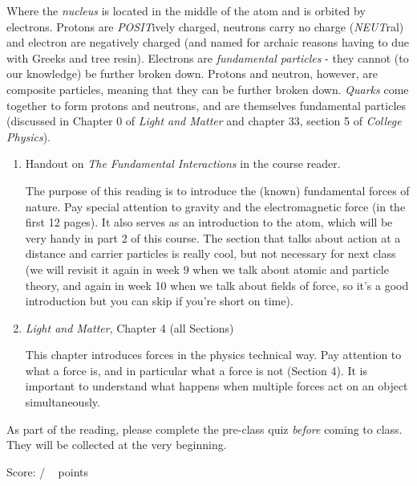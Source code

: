 \documentclass[addpoints,12pt]{exam}
\begin{document}
Where the \textit{nucleus} is located in the middle of the atom and is orbited by electrons. Protons are \textit{POSIT}ively charged, neutrons carry no charge (\textit{NEUT}ral) and electron are negatively charged (and named for archaic reasons having to due with Greeks and tree resin). Electrons are \textit{fundamental particles} - they cannot (to our knowledge) be further broken down. Protons and neutron, however, are composite particles, meaning that they can be further broken down. \textit{Quarks} come together to form protons and neutrons, and are themselves fundamental particles (discussed in Chapter 0 of \textit{Light and Matter} and chapter 33, section 5 of \textit{College Physics}).

\begin{enumerate}

	\item Handout on \textit{The Fundamental Interactions} in the course reader.
	
	The purpose of this reading is to introduce the (known) fundamental forces of nature. Pay special attention to gravity and the electromagnetic force (in the first 12 pages). It also serves as an introduction to the atom, which will be very handy in part 2 of this course. The section that talks about action at a distance and carrier particles is really cool, but not necessary for next class (we will revisit it again in week 9 when we talk about atomic and particle theory, and again in week 10 when we talk about fields of force, so it's a good introduction but you can skip if you're short on time).
	
	\item \textit{Light and Matter}, Chapter 4 (all Sections)
	
	This chapter introduces forces in the physics technical way. Pay attention to what a force is, and in particular what a force is not (Section 4). It is important to understand what happens when multiple forces act on an object simultaneously.
	
	
\end{enumerate}

As part of the reading, please complete the pre-class quiz \textit{before} coming to class. They will be collected at the very beginning.
 
\clearpage

\begin{flushright}
Score: \hspace{0.2in} / \numpoints ~ points
\end{flushright}
\end{document}
